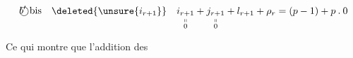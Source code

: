 {\[
\text{\textcircled{$b'$ bis}}\quad\deleted{\unsure{i_{r+1}}}\quad
\underset{\substack{\shortparallel\\0}}{i_{r+1}}+\underset{\substack{\shortparallel\\0}}{j_{r+1}}+l_{r+1}+\rho_r=(p-1)+p\mathbin{.}0
\]

  Ce qui montre que  l'addition des}

